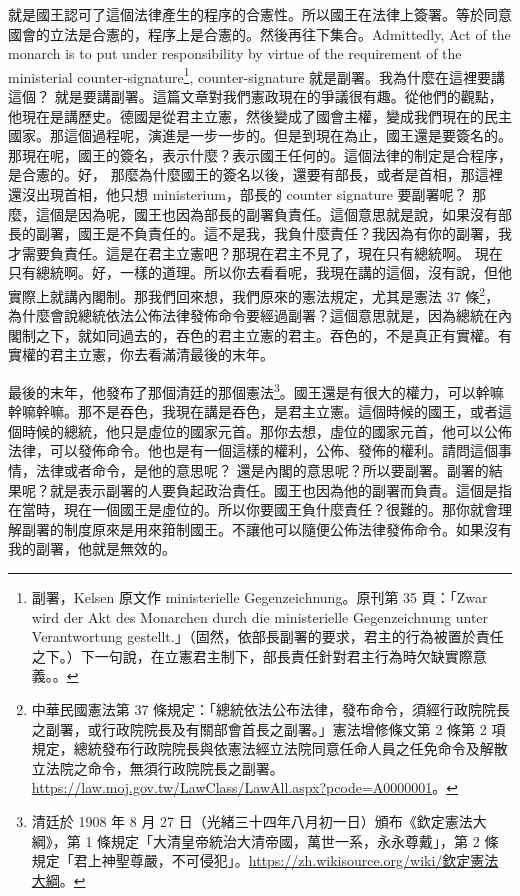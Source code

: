 \hypertarget{w05:cue:83}{}就是國王認可了這個法律產生的程序的合憲性。所以國王在法律上簽署。等於同意國會的立法是合憲的，程序上是合憲的。然後再往下集合。Admittedly, Act of the monarch is to put under responsibility by virtue of the requirement of the ministerial counter-signature\footnote{副署，Kelsen 原文作 ministerielle Gegenzeichnung。原刊第 35 頁：「Zwar wird der Akt des Monarchen durch die ministerielle Gegenzeichnung unter Verantwortung gestellt.」（固然，依部長副署的要求，君主的行為被置於責任之下。）下一句說，在立憲君主制下，部長責任針對君主行為時欠缺實際意義。\cite[35]{kelsen1929}。}, counter-signature 就是副署。我為什麼在這裡要講這個？
\hypertarget{w05:cue:84}{}就是要講副署。這篇文章對我們憲政現在的爭議很有趣。從他們的觀點，他現在是講歷史。德國是從君主立憲，然後變成了國會主權，變成我們現在的民主國家。那這個過程呢，演進是一步一步的。但是到現在為止，國王還是要簽名的。那現在呢，國王的簽名，表示什麼？表示國王任何的。這個法律的制定是合程序，是合憲的。好，
\hypertarget{w05:cue:85}{}那麼為什麼國王的簽名以後，還要有部長，或者是首相，那這裡還沒出現首相，他只想 ministerium，部長的 counter signature 要副署呢？
\hypertarget{w05:cue:86}{}那麼，這個是因為呢，國王也因為部長的副署負責任。這個意思就是說，如果沒有部長的副署，國王是不負責任的。這不是我，我負什麼責任？我因為有你的副署，我才需要負責任。這是在君主立憲吧？那現在君主不見了，現在只有總統啊。
\hypertarget{w05:cue:87}{}現在只有總統啊。好，一樣的道理。所以你去看看呢，我現在講的這個，沒有說，但他實際上就講內閣制。那我們回來想，我們原來的憲法規定，尤其是憲法 37 條\footnote{中華民國憲法第 37 條規定：「總統依法公布法律，發布命令，須經行政院院長之副署，或行政院院長及有關部會首長之副署。」憲法增修條文第 2 條第 2 項規定，總統發布行政院院長與依憲法經立法院同意任命人員之任免命令及解散立法院之命令，無須行政院院長之副署。\url{https://law.moj.gov.tw/LawClass/LawAll.aspx?pcode=A0000001}。}，為什麼會說總統依法公佈法律發佈命令要經過副署？這個意思就是，因為總統在內閣制之下，就如同過去的，吞色的君主立憲的君主。吞色的，不是真正有實權。有實權的君主立憲，你去看滿清最後的末年。

\hypertarget{w05:cue:88}{}最後的末年，他發布了那個清廷的那個憲法\footnote{清廷於 1908 年 8 月 27 日（光緒三十四年八月初一日）頒布《欽定憲法大綱》，第 1 條規定「大清皇帝統治大清帝國，萬世一系，永永尊戴」，第 2 條規定「君上神聖尊嚴，不可侵犯」。\href{https://zh.wikisource.org/wiki/\%E6\%AC\%BD\%E5\%AE\%9A\%E6\%86\%B2\%E6\%B3\%95\%E5\%A4\%A7\%E7\%B6\%B1}{https://zh.wikisource.org/wiki/欽定憲法大綱}。}。國王還是有很大的權力，可以幹嘛幹嘛幹嘛。那不是吞色，我現在講是吞色，是君主立憲。這個時候的國王，或者這個時候的總統，他只是虛位的國家元首。那你去想，虛位的國家元首，他可以公佈法律，可以發佈命令。他也是有一個這樣的權利，公佈、發佈的權利。請問這個事情，法律或者命令，是他的意思呢？
\hypertarget{w05:cue:89}{}還是內閣的意思呢？所以要副署。副署的結果呢？就是表示副署的人要負起政治責任。國王也因為他的副署而負責。這個是指在當時，現在一個國王是虛位的。所以你要國王負什麼責任？很難的。那你就會理解副署的制度原來是用來箝制國王。不讓他可以隨便公佈法律發佈命令。如果沒有我的副署，他就是無效的。

